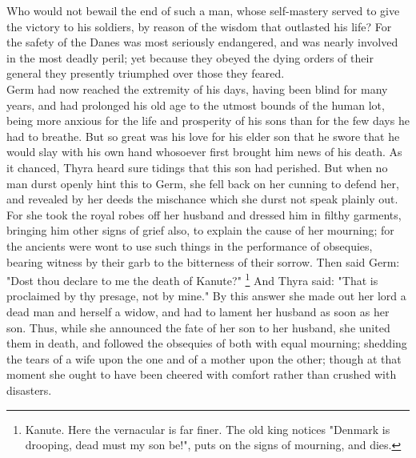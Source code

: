 \documentclass[10pt,a4paper]{report}
\begin{document}
Who would not bewail the end of such a man, whose self-mastery served to give the victory to his soldiers, by reason of the wisdom that outlasted his life? For the safety of the Danes was most seriously endangered, and was nearly involved in the most deadly peril; yet because they obeyed the dying orders of their general they presently triumphed over those they feared.\\

Germ had now reached the extremity of his days, having been blind for many years, and had prolonged his old age to the utmost bounds of the human lot, being more anxious for the life and prosperity of his sons than for the few days he had to breathe. But so great was his love for his elder son that he swore that he would slay with his own hand whosoever first brought him news of his death. As it chanced, Thyra heard sure tidings that this son had perished. But when no man durst openly hint this to Germ, she fell back on her cunning to defend her, and revealed by her deeds the mischance which she durst not speak plainly out. For she took the royal robes off her husband and dressed him in filthy garments, bringing him other signs of grief also, to explain the cause of her mourning; for the ancients were wont to use such things in the performance of obsequies, bearing witness by their garb to the bitterness of their sorrow. Then said Germ: "Dost thou declare to me the death of Kanute?" \footnote{Kanute.  Here the vernacular is far finer.  The old king notices "Denmark is drooping, dead must my son be!", puts on the signs of mourning, and dies.} And Thyra said: "That is proclaimed by thy presage, not by mine." By this answer she made out her lord a dead man and herself a widow, and had to lament her husband as soon as her son. Thus, while she announced the fate of her son to her husband, she united them in death, and followed the obsequies of both with equal mourning; shedding the tears of a wife upon the one and of a mother upon the other; though at that moment she ought to have been cheered with comfort rather than crushed with disasters.\\
\end{document}
